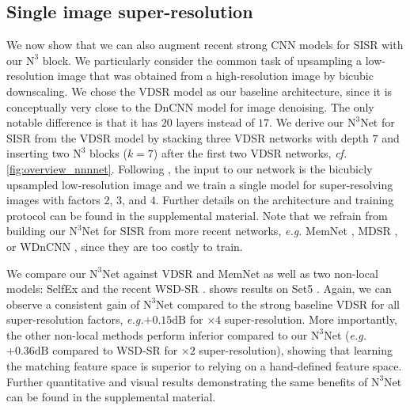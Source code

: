 \documentclass{article}
\makeatletter
\newcommand{\eg}{\emph{e.\thinspace{}g.}\@\xspace}
\newcommand{\cf}{\emph{cf.}\@\xspace}
\newcommand\kk{k}
\newcommand\nnn{\text{N}^3}
\makeatother
\begin{document}
\subsection{Single image super-resolution}
We now show that we can also augment recent strong CNN models for SISR with our $\nnn$ block.
We particularly consider the common task \cite{Huang:2015:SelfEx,Kim:2016:VDSR} of upsampling a low-resolution image that was obtained from a high-resolution image by bicubic downscaling.
We chose the VDSR model \cite{Kim:2016:VDSR} as our baseline architecture, since
it is conceptually very close to the DnCNN model for image denoising.
The only notable difference is that it has $20$ layers instead of $17$.
We derive our $\nnn$Net for SISR from the VDSR model by stacking three VDSR networks with depth $7$ and inserting two $\nnn$ blocks ($\kk=7$) after the first two VDSR networks, \cf \cref{fig:overview_nnnnet}. 
Following \cite{Kim:2016:VDSR}, the input to our network is the bicubicly upsampled low-resolution image
and we train a single model for super-resolving images with factors $2$, $3$, and $4$.
Further details on the architecture and training protocol can be found in the supplemental material.
Note that we refrain from building our $\nnn$Net for SISR from more recent networks, \eg MemNet \cite{Tai:2017:MPM}, MDSR \cite{Lim:2017:EDR}, or WDnCNN \cite{Bae:2017:BDR}, since they are too costly to train.

We compare our $\nnn$Net against VDSR and MemNet as well as two non-local models: SelfEx \cite{Huang:2015:SelfEx} and the recent WSD-SR \cite{Cruz:2018:SIS}.
 shows results on Set5 \cite{Bevilacqua:2012:LCS}. 
Again, we can observe a consistent gain of $\nnn$Net compared to the strong baseline VDSR for all super-resolution factors, \eg $+0.15 \text{dB}$ for $\times4$ super-resolution.
More importantly, the other non-local methods perform inferior compared to our $\nnn$Net (\eg $+0.36 \text{dB}$ compared to WSD-SR for $\times 2$ super-resolution), showing that learning the matching feature space is superior to relying on a hand-defined feature space.
Further quantitative and visual results demonstrating the same benefits of $\nnn$Net can be found in the supplemental material.
\end{document}
